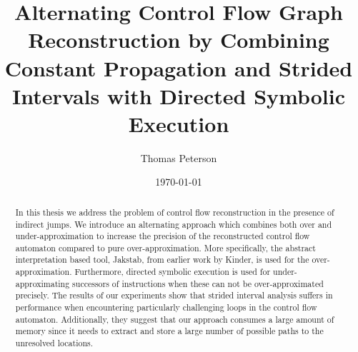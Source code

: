 \documentclass{kththesis}
\title{Alternating Control Flow Graph Reconstruction by Combining Constant Propagation and Strided Intervals with Directed Symbolic Execution}
\author{Thomas Peterson}
\date{\today}
\begin{document}
\frontmatter

\titlepage

\begin{abstract}
In this thesis we address the problem of control flow reconstruction in the presence of indirect jumps. We introduce an alternating approach which combines both over and under-approximation to increase the precision of the reconstructed control flow automaton compared to pure over-approximation. More specifically, the abstract interpretation based tool, Jakstab, from earlier work by Kinder, is used for the over-approximation. Furthermore, directed symbolic execution is used for under-approximating successors of instructions when these can not be over-approximated precisely. The results of our experiments show that strided interval analysis suffers in performance when encountering particularly challenging loops in the control flow automaton. Additionally, they suggest that our approach consumes a large amount of memory since it needs to extract and store a large number of possible paths to the unresolved locations. 
\end{abstract}
\end{document}
